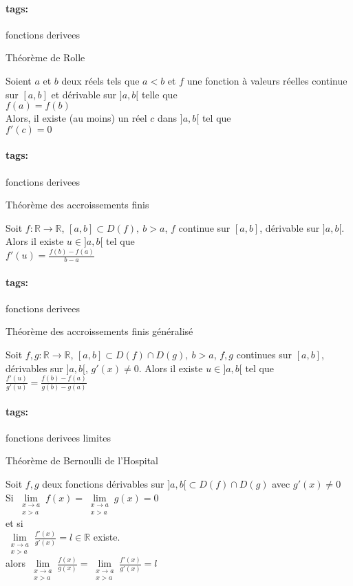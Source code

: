 \documentclass[12pt]{article}
\newcommand*{\xfield}[1]{\begin{mdframed}\centering #1\end{mdframed}\bigskip}
\newenvironment{note}{}{}
\newcommand*{\tags}[1]{\paragraph{tags: }#1}
\begin{document}
\begin{note}
	\tags{fonctions derivees}
	\xfield{Théorème de Rolle}
	\xfield{Soient $a$ et $b$ deux réels tels que $a < b$ et $f$ une fonction à valeurs réelles continue sur $[a, b]$ et dérivable sur $]a, b[$ telle que\\
$f(a)=f(b)$\\
Alors, il existe (au moins) un réel $c$ dans $]a, b[$ tel que\\
$f'(c)=0$ }
\end{note}

\begin{note}
	\tags{fonctions derivees}
	\xfield{Théorème des accroissements finis}
	\xfield{Soit $f : \mathbb{R} \rightarrow \mathbb{R}$, $[a,b] \subset D(f),\ b>a$, $f$ continue sur $[a,b]$, dérivable sur $]a,b[$. Alors il existe $u\in ]a,b[$ tel que\\
$f'(u)=\frac{f(b)-f(a)}{b-a}$}
\end{note}

\begin{note}
	\tags{fonctions derivees}
	\xfield{Théorème des accroissements finis généralisé}
	\xfield{Soit $f,g : \mathbb{R} \rightarrow \mathbb{R}$, $[a,b] \subset D(f) \cap D(g),\ b>a$, $f,g$ continues sur $[a,b]$, dérivables sur $]a,b[$, $g'(x) \neq 0$. Alors il existe $u\in ]a,b[$ tel que\\
$\frac{f'(u)}{g'(u)}=\frac{f(b)-f(a)}{g(b)-g(a)}$}
\end{note}

\begin{note}
	\tags{fonctions derivees limites}
	\xfield{Théorème de Bernoulli de l'Hospital}
	\xfield{Soit $f,g$ deux fonctions dérivables sur $]a,b[ \subset D(f) \cap D(g)$ avec $g'(x) \neq 0$\\
	Si $\lim\limits_{\substack{x \to a\\ x > a}} f(x) = \lim\limits_{\substack{x \to a\\ x > a}} g(x) = 0$\\
	 et si \\
	 $\lim\limits_{\substack{x \to a\\ x > a}} \frac{f'(x)}{g'(x)} = l \in \mathbb{R}$ existe.\\
	 alors $\lim\limits_{\substack{x \to a\\ x > a}} \frac{f(x)}{g(x)} = \lim\limits_{\substack{x \to a\\ x > a}} \frac{f'(x)}{g'(x)} = l$
	 }
\end{note}
\end{document}
